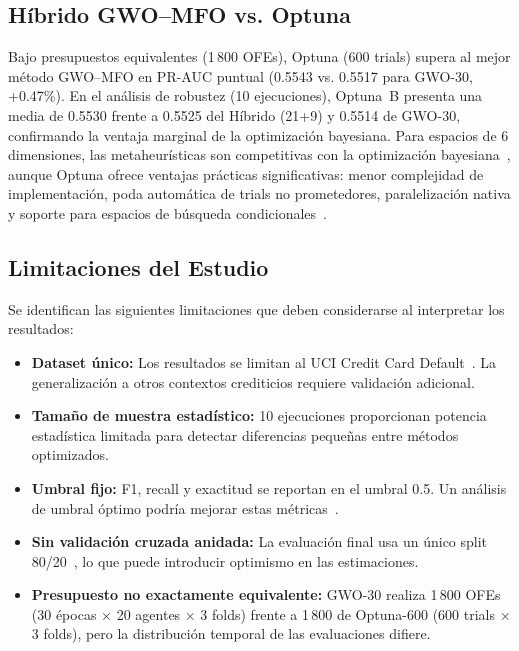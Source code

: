\documentclass[journal]{IEEEtran}
\begin{document}
\subsection{Híbrido GWO--MFO vs. Optuna}
Bajo presupuestos equivalentes (1\,800 OFEs), Optuna (600 trials) supera al mejor método GWO--MFO en PR-AUC puntual (0.5543 vs. 0.5517 para GWO-30, +0.47\%). En el análisis de robustez (10 ejecuciones), Optuna~B presenta una media de 0.5530 frente a 0.5525 del Híbrido (21+9) y 0.5514 de GWO-30, confirmando la ventaja marginal de la optimización bayesiana. Para espacios de 6 dimensiones, las metaheurísticas son competitivas con la optimización bayesiana~\cite{hutter2011}, aunque Optuna ofrece ventajas prácticas significativas: menor complejidad de implementación, poda automática de trials no prometedores, paralelización nativa y soporte para espacios de búsqueda condicionales~\cite{akiba2019}.

\subsection{Limitaciones del Estudio}
Se identifican las siguientes limitaciones que deben considerarse al interpretar los resultados:
\begin{itemize}[leftmargin=*]
    \item \textbf{Dataset único:} Los resultados se limitan al UCI Credit Card Default~\cite{yeh2009}. La generalización a otros contextos crediticios requiere validación adicional.
    \item \textbf{Tamaño de muestra estadístico:} 10 ejecuciones proporcionan potencia estadística limitada para detectar diferencias pequeñas entre métodos optimizados.
    \item \textbf{Umbral fijo:} F1, recall y exactitud se reportan en el umbral 0.5. Un análisis de umbral óptimo podría mejorar estas métricas~\cite{fawcett2006}.
    \item \textbf{Sin validación cruzada anidada:} La evaluación final usa un único split 80/20~\cite{demsar2006}, lo que puede introducir optimismo en las estimaciones.
    \item \textbf{Presupuesto no exactamente equivalente:} GWO-30 realiza 1\,800 OFEs (30 épocas $\times$ 20 agentes $\times$ 3 folds) frente a 1\,800 de Optuna-600 (600 trials $\times$ 3 folds), pero la distribución temporal de las evaluaciones difiere.
\end{itemize}
\end{document}
